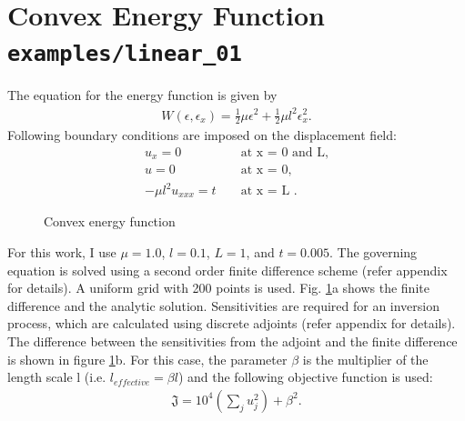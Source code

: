 \documentclass[%
notitlepage,
]{revtex4-1}
\newcommand{\be}{\ensuremath{{\beta}}\xspace}
\begin{document}
\section{Convex Energy Function \texttt{examples/linear\_01}}
The equation for the energy function is given by
\begin{eqnarray}
  W(\epsilon, \epsilon_x) = \frac{1}{2}\mu\epsilon^2 + \frac{1}{2}\mu l^2 \epsilon_x^2.
\end{eqnarray}
Following boundary conditions are imposed on the displacement field:
\begin{eqnarray}
  u_x = 0 &&\text{ at x = 0 and L},\\
  u = 0 &&\text{ at x = 0},\\
 -\mu l^2 u_{xxx} = t &&\text{ at x = L }.
\end{eqnarray}
\begin{figure}[!h]
    \caption{Convex energy function}
    \label{fig:convex:1}
\end{figure}
For this work, I use $\mu = 1.0$, $l = 0.1$, $L = 1$, and $t = 0.005$. The governing equation is solved using a second order finite difference scheme (refer appendix for details). A uniform grid with 200 points is used. Fig. \ref{fig:convex:1}a shows the finite difference and the analytic solution. Sensitivities are required for an inversion process, which are calculated using discrete adjoints (refer appendix for details). The difference between the sensitivities from the adjoint and the finite difference is shown in figure \ref{fig:convex:1}b. For this case, the parameter \be is the multiplier of the length scale l (i.e. $l_{effective} = \be l$) and the following objective function is used:
\begin{eqnarray}
  \mathfrak{J} = 10^4\left(\sum_j u_j^2\right) + \be^2.
\end{eqnarray}
\end{document}
